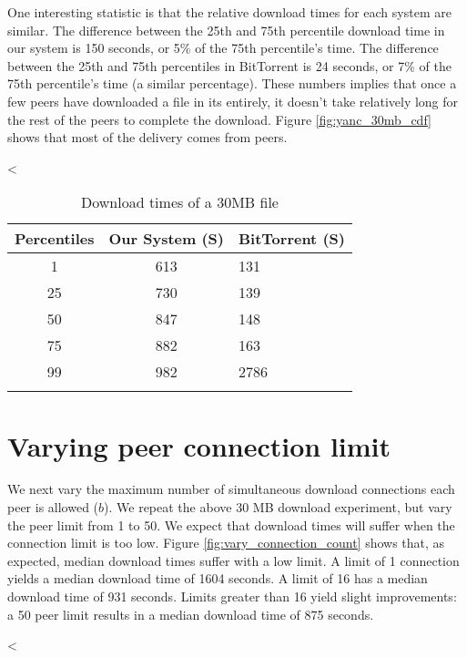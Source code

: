 One interesting statistic is that the relative download times for each system are similar.
The difference between the 25th and 75th percentile download time in our system is 150 seconds, 
or 5\% of the 75th percentile's time. The difference between the 25th and 75th percentiles in BitTorrent 
is 24 seconds, or 7\% of the 75th percentile's time (a similar percentage). These numbers implies that once 
a few peers have downloaded a file in its entirely, it doesn't take relatively long for the rest of the peers to complete 
the download.  Figure \ref{fig:yanc_30mb_cdf} shows that most of the delivery comes from peers.

<%
\small{
\small{
\begin{table}
  \caption{Download times of a 30MB file}
\begin{center}
\begin{tabular}{ c c l }
  Percentiles & Our System (S) & BitTorrent (S) \\
  \hline
  1 & 613 & 131 \\
  25 & 730 & 139 \\
  50 & 847 & 148 \\
  75 & 882 & 163 \\
  99 & 982 & 2786 \\
  \label{fig:yanc_vs_bt}
\end{tabular}
\end{center}
\end{table}
}
}
\section{Varying peer connection limit} 

We next vary the maximum number of simultaneous download connections each peer is allowed ($b$). We 
repeat the above 30 MB download experiment, but vary the peer limit from 1 to 50. 
We expect that download times will suffer when the connection limit is too low. Figure \ref{fig:vary_connection_count} shows that, as expected, median 
download times suffer with a low limit.  A limit of 1 connection yields a median download time of 1604 seconds.  A limit of 16 has a median download time of 931 seconds.  Limits greater than 16 yield
slight improvements: a 50 peer limit results in a median download time of 875 seconds.

<%
